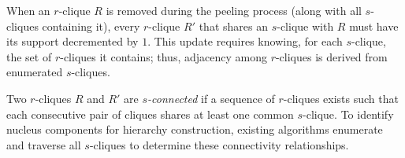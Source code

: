 When an $r$-clique $R$ is removed during the peeling process (along with all $s$-cliques containing it), every $r$-clique $R'$ that shares an $s$-clique with $R$ must have its support decremented by $1$. 
This update requires knowing, for each $s$-clique, the set of $r$-cliques it contains; thus, adjacency among $r$-cliques is derived from enumerated $s$-cliques.

%
Two $r$-cliques $R$ and $R'$ are \emph{$s$-connected} if a sequence of $r$-cliques exists such that each consecutive pair of cliques shares at least one common $s$-clique. 
To identify nucleus components for hierarchy construction, existing algorithms enumerate and traverse all $s$-cliques to determine these connectivity relationships.



 


